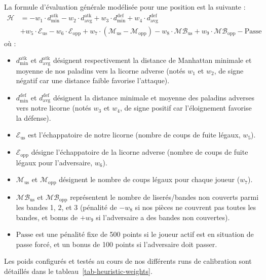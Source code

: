 \documentclass[12pt,a4paper]{article}
\begin{document}
La formule d'évaluation générale modélisée pour une position est la suivante :
\begin{align*}
\mathcal{H} &= - w_{1} \cdot d^{\text{atk}}_{\min} - w_{2} \cdot d^{\text{atk}}_{\text{avg}} + w_{3} \cdot d^{\text{def}}_{\min} + w_{4} \cdot d^{\text{def}}_{\text{avg}} \\
            &+ w_{5} \cdot \mathcal{E}_{\text{us}} - w_{6} \cdot \mathcal{E}_{\text{opp}} + w_{7} \cdot (\mathcal{M}_{\text{us}} - \mathcal{M}_{\text{opp}}) - w_{8} \cdot \mathcal{MB}_{\text{us}} + w_{9} \cdot \mathcal{MB}_{\text{opp}} - \text{Passe}
\end{align*}
où :
\begin{itemize}
    \item $d^{\text{atk}}_{\min}$ et $d^{\text{atk}}_{\text{avg}}$ désignent respectivement la distance de Manhattan minimale et moyenne de nos paladins vers la licorne adverse (notés $w_1$ et $w_2$, de signe négatif car une distance faible favorise l'attaque).
    \item $d^{\text{def}}_{\min}$ et $d^{\text{def}}_{\text{avg}}$ désignent la distance minimale et moyenne des paladins adverses vers notre licorne (notés $w_3$ et $w_4$, de signe positif car l'éloignement favorise la défense).
    \item $\mathcal{E}_{\text{us}}$ est l'échappatoire de notre licorne (nombre de coups de fuite légaux, $w_5$).
    \item $\mathcal{E}_{\text{opp}}$ désigne l'échappatoire de la licorne adverse (nombre de coups de fuite légaux pour l'adversaire, $w_6$).
    \item $\mathcal{M}_{\text{us}}$ et $\mathcal{M}_{\text{opp}}$ désignent le nombre de coups légaux pour chaque joueur ($w_7$).
    \item $\mathcal{MB}_{\text{us}}$ et $\mathcal{MB}_{\text{opp}}$ représentent le nombre de liserés/bandes non couverts parmi les bandes 1, 2, et 3 (pénalité de $-w_8$ si nos pièces ne couvrent pas toutes les bandes, et bonus de $+w_9$ si l'adversaire a des bandes non couvertes).
    \item $\text{Passe}$ est une pénalité fixe de 500 points si le joueur actif est en situation de passe forcé, et un bonus de 100 points si l'adversaire doit passer.
\end{itemize}

Les poids configurés et testés au cours de nos différents runs de calibration sont détaillés dans le tableau~\ref{tab-heuristic-weights}.
\end{document}
